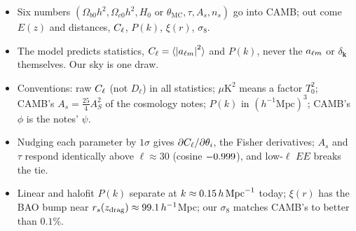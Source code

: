 \begin{recap}
\begin{itemize}[leftmargin=1.2em,itemsep=1pt]
\item Six numbers $(\Omega_{b0}h^2,\Omega_{c0}h^2,H_0\text{ or }\theta_{\mathrm{MC}},\tau,A_s,n_s)$ go into CAMB; out come $E(z)$ and distances, $C_\ell$, $P(k)$, $\xi(r)$, $\sigma_8$.
\item The model predicts statistics, $C_\ell=\langle\left\lvert a_{\ell m}\right\rvert^2\rangle$ and $P(k)$, never the $a_{\ell m}$ or $\delta_{\bm k}$ themselves. Our sky is one draw.
\item Conventions: raw $C_\ell$ (not $D_\ell$) in all statistics; $\mu\mathrm K^2$ means a factor $T_0^2$; CAMB's $A_s=\frac{25}{4}A_S^2$ of the cosmology notes; $P(k)$ in $(h^{-1}\mathrm{Mpc})^3$; CAMB's $\phi$ is the notes' $\psi$.
\item Nudging each parameter by $1\sigma$ gives $\partial C_\ell/\partial\theta_i$, the Fisher derivatives; $A_s$ and $\tau$ respond identically above $\ell\approx30$ (cosine $-0.999$), and low-$\ell$ $EE$ breaks the tie.
\item Linear and halofit $P(k)$ separate at $k\approx0.15\,h\,\mathrm{Mpc}^{-1}$ today; $\xi(r)$ has the BAO bump near $r_s(z_{\mathrm{drag}})\approx99.1\,h^{-1}$Mpc; our $\sigma_8$ matches CAMB's to better than $0.1\%$.
\end{itemize}
\end{recap}

